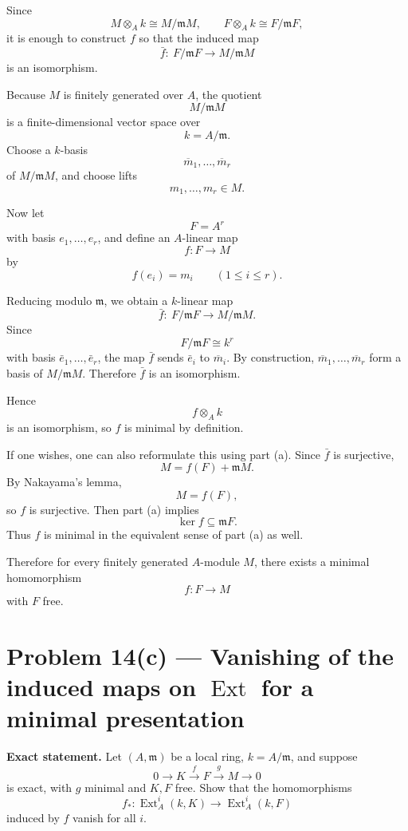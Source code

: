 \documentclass[12pt,a4paper]{article}
\theoremstyle{plain}
\theoremstyle{definition}      %
\begin{document}
Since
\[
M\otimes_A k \cong M/\mathfrak m M,
\qquad
F\otimes_A k \cong F/\mathfrak m F,
\]
it is enough to construct \(f\) so that the induced map
\[
\bar f:\ F/\mathfrak m F \to M/\mathfrak m M
\]
is an isomorphism.

Because \(M\) is finitely generated over \(A\), the quotient
\[
M/\mathfrak m M
\]
is a finite-dimensional vector space over
\[
k=A/\mathfrak m.
\]
Choose a \(k\)-basis
\[
\overline{m}_1,\dots,\overline{m}_r
\]
of \(M/\mathfrak m M\), and choose lifts
\[
m_1,\dots,m_r\in M.
\]

Now let
\[
F=A^r
\]
with basis \(e_1,\dots,e_r\), and define an \(A\)-linear map
\[
f:F\to M
\]
by
\[
f(e_i)=m_i
\qquad (1\le i\le r).
\]

Reducing modulo \(\mathfrak m\), we obtain a \(k\)-linear map
\[
\bar f:\ F/\mathfrak m F \to M/\mathfrak m M.
\]
Since
\[
F/\mathfrak m F \cong k^r
\]
with basis \(\bar e_1,\dots,\bar e_r\), the map \(\bar f\) sends \(\bar e_i\) to \(\overline{m}_i\). By construction, \(\overline{m}_1,\dots,\overline{m}_r\) form a basis of \(M/\mathfrak m M\). Therefore \(\bar f\) is an isomorphism.

Hence
\[
f\otimes_A k
\]
is an isomorphism, so \(f\) is minimal by definition.

\medskip

If one wishes, one can also reformulate this using part (a). Since \(\bar f\) is surjective,
\[
M=f(F)+\mathfrak m M.
\]
By Nakayama's lemma,
\[
M=f(F),
\]
so \(f\) is surjective. Then part (a) implies
\[
\ker f\subseteq \mathfrak m F.
\]
Thus \(f\) is minimal in the equivalent sense of part (a) as well.

\medskip

Therefore for every finitely generated \(A\)-module \(M\), there exists a minimal homomorphism
\[
f:F\to M
\]
with \(F\) free.

\section*{Problem 14(c) --- Vanishing of the induced maps on \texorpdfstring{$\operatorname{Ext}$}{Ext} for a minimal presentation}

\textbf{Exact statement.}
Let \((A,\mathfrak m)\) be a local ring, \(k=A/\mathfrak m\), and suppose
\[
0\longrightarrow K \xrightarrow{\,f\,} F \xrightarrow{\,g\,} M \longrightarrow 0
\]
is exact, with \(g\) minimal and \(K,F\) free. Show that the homomorphisms
\[
f_*:\operatorname{Ext}_A^i(k,K)\longrightarrow \operatorname{Ext}_A^i(k,F)
\]
induced by \(f\) vanish for all \(i\).
\end{document}
